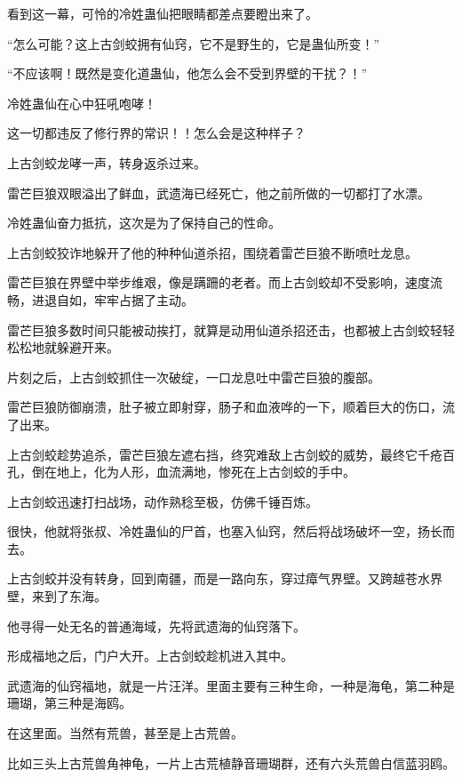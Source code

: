 
\begin{this_body}

看到这一幕，可怜的冷姓蛊仙把眼睛都差点要瞪出来了。

“怎么可能？这上古剑蛟拥有仙窍，它不是野生的，它是蛊仙所变！”

“不应该啊！既然是变化道蛊仙，他怎么会不受到界壁的干扰？！”

冷姓蛊仙在心中狂吼咆哮！

这一切都违反了修行界的常识！！怎么会是这种样子？

上古剑蛟龙哮一声，转身返杀过来。

雷芒巨狼双眼溢出了鲜血，武遗海已经死亡，他之前所做的一切都打了水漂。

冷姓蛊仙奋力抵抗，这次是为了保持自己的性命。

上古剑蛟狡诈地躲开了他的种种仙道杀招，围绕着雷芒巨狼不断喷吐龙息。

雷芒巨狼在界壁中举步维艰，像是蹒跚的老者。而上古剑蛟却不受影响，速度流畅，进退自如，牢牢占据了主动。

雷芒巨狼多数时间只能被动挨打，就算是动用仙道杀招还击，也都被上古剑蛟轻轻松松地就躲避开来。

片刻之后，上古剑蛟抓住一次破绽，一口龙息吐中雷芒巨狼的腹部。

雷芒巨狼防御崩溃，肚子被立即射穿，肠子和血液哗的一下，顺着巨大的伤口，流了出来。

上古剑蛟趁势追杀，雷芒巨狼左遮右挡，终究难敌上古剑蛟的威势，最终它千疮百孔，倒在地上，化为人形，血流满地，惨死在上古剑蛟的手中。

上古剑蛟迅速打扫战场，动作熟稔至极，仿佛千锤百炼。

很快，他就将张叔、冷姓蛊仙的尸首，也塞入仙窍，然后将战场破坏一空，扬长而去。

上古剑蛟并没有转身，回到南疆，而是一路向东，穿过瘴气界壁。又跨越苍水界壁，来到了东海。

他寻得一处无名的普通海域，先将武遗海的仙窍落下。

形成福地之后，门户大开。上古剑蛟趁机进入其中。

武遗海的仙窍福地，就是一片汪洋。里面主要有三种生命，一种是海龟，第二种是珊瑚，第三种是海鸥。

在这里面。当然有荒兽，甚至是上古荒兽。

比如三头上古荒兽角神龟，一片上古荒植静音珊瑚群，还有六头荒兽白信蓝羽鸥。


\end{this_body}
